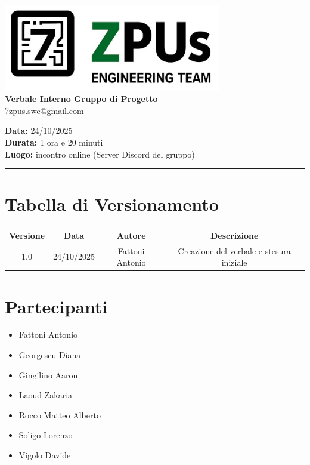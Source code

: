 \documentclass[a4paper,12pt]{article}
\begin{document}
\begin{center}
    \includegraphics[width=9.5cm]{../../../assets/logo7zpus.jpg}\\
    \Large \textbf{Verbale Interno Gruppo di Progetto}\\
    \vspace{0.5cm}
    \small\hspace{10cm} 7zpus.swe@gmail.com
\end{center}

\noindent
\textbf{Data:} 24/10/2025 \\
\textbf{Durata:} 1 ora e 20 minuti \\
\textbf{Luogo:} incontro online (Server Discord del gruppo)

\vspace{0.3cm}
\hrule
\vspace{0.5cm}

\tableofcontents

\newpage

\section{Tabella di Versionamento}
    \begin{tabular}{|c|c|c|c|}
        \hline
        \textbf{Versione} & \textbf{Data} & \textbf{Autore} & \textbf{Descrizione} \\
        \hline
        1.0 & 24/10/2025 & Fattoni Antonio & Creazione del verbale e stesura iniziale \\
        \hline
    \end{tabular}


\section{Partecipanti}
\begin{itemize}[noitemsep]
    \item Fattoni Antonio 
    \item Georgescu Diana
    \item Gingilino Aaron
    \item Laoud Zakaria
    \item Rocco Matteo Alberto
    \item Soligo Lorenzo
    \item Vigolo Davide
\end{itemize}
\end{document}
